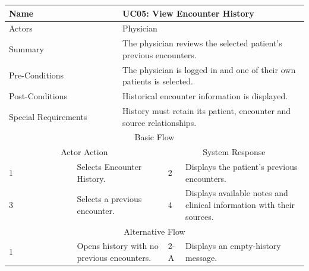 \begin{reporttable}
\centering
\small
\caption{UC05: View Encounter History.}
\label{tab:kashaf:uc05}
\begin{tabular}{|p{}|p{}|p{}|p{}|p{}|}
\hline
\multicolumn{2}{|p{\dimexpr0.225\textwidth+2\tabcolsep+\arrayrulewidth\relax}|}{Name} & \multicolumn{3}{p{\dimexpr0.575\textwidth+4\tabcolsep+2\arrayrulewidth\relax}|}{UC05: View Encounter History} \\ \hline
\multicolumn{2}{|p{\dimexpr0.225\textwidth+2\tabcolsep+\arrayrulewidth\relax}|}{Actors} & \multicolumn{3}{p{\dimexpr0.575\textwidth+4\tabcolsep+2\arrayrulewidth\relax}|}{Physician} \\ \hline
\multicolumn{2}{|p{\dimexpr0.225\textwidth+2\tabcolsep+\arrayrulewidth\relax}|}{Summary} & \multicolumn{3}{p{\dimexpr0.575\textwidth+4\tabcolsep+2\arrayrulewidth\relax}|}{The physician reviews the selected patient's previous encounters.} \\ \hline
\multicolumn{2}{|p{\dimexpr0.225\textwidth+2\tabcolsep+\arrayrulewidth\relax}|}{Pre-Conditions} & \multicolumn{3}{p{\dimexpr0.575\textwidth+4\tabcolsep+2\arrayrulewidth\relax}|}{The physician is logged in and one of their own patients is selected.} \\ \hline
\multicolumn{2}{|p{\dimexpr0.225\textwidth+2\tabcolsep+\arrayrulewidth\relax}|}{Post-Conditions} & \multicolumn{3}{p{\dimexpr0.575\textwidth+4\tabcolsep+2\arrayrulewidth\relax}|}{Historical encounter information is displayed.} \\ \hline
\multicolumn{2}{|p{\dimexpr0.225\textwidth+2\tabcolsep+\arrayrulewidth\relax}|}{Special Requirements} & \multicolumn{3}{p{\dimexpr0.575\textwidth+4\tabcolsep+2\arrayrulewidth\relax}|}{History must retain its patient, encounter and source relationships.} \\ \hline
\multicolumn{5}{|c|}{Basic Flow} \\ \hline
\multicolumn{3}{|c|}{Actor Action} & \multicolumn{2}{c|}{System Response} \\ \hline
1 & \multicolumn{2}{p{\dimexpr0.37\textwidth+2\tabcolsep+\arrayrulewidth\relax}|}{Selects Encounter History.} & 2 & Displays the patient's previous encounters. \\ \hline
3 & \multicolumn{2}{p{\dimexpr0.37\textwidth+2\tabcolsep+\arrayrulewidth\relax}|}{Selects a previous encounter.} & 4 & Displays available notes and clinical information with their sources. \\ \hline
\multicolumn{5}{|c|}{Alternative Flow} \\ \hline
1 & \multicolumn{2}{p{\dimexpr0.37\textwidth+2\tabcolsep+\arrayrulewidth\relax}|}{Opens history with no previous encounters.} & 2-A & Displays an empty-history message. \\ \hline
\end{tabular}
\end{reporttable}

